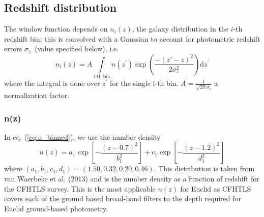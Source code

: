 \subsection{Redshift distribution}
\label{sec:WL_nofz}

The window function depends on $n_{i}(z)$, the galaxy distribution
in the $i$-th redshift bin: this is convolved with a Gaussian to account for photometric
redshift errors $\sigma_{z}$~(value specified below), i.e.~
\begin{equation}
n_{i}(z)=A \int\limits _{i\text{-th bin}}n({z^\prime})\exp\left(\frac{-(z\prime-z)^{2}}{2 \sigma_{z}^{2}}\right)\mathrm{d}{z^\prime}
\label{eq:n_binned}
\end{equation}
where the integral is done over $z^\prime$ for the single i-th bin. 
$A = \frac{1}{\sqrt{2\pi} \sigma_z}$ a normalization factor.

\subsubsection{n(z)}
In eq. (\ref{eq:n_binned}), we use the number density
\begin{equation}
n(z) = a_1\exp\left[-\frac{(z-0.7)^2}{b_1^2}\right]+c_1\exp\left[-\frac{(z-1.2)^2}{d_1^2}\right]
\label{eq:n_of_z_base}
\end{equation}
where $(a_1, b_1, c_1, d_1)=(1.50, 0.32, 0.20, 0.46)$. This distribution is taken from van Waerbeke et al. (2013) and 
is the number density as a function of redshift for the CFHTLS survey. This is the most applicable $n(z)$ for Euclid as 
CFHTLS covers each of the ground based broad-band filters to the depth required for Euclid ground-based photometry. 


